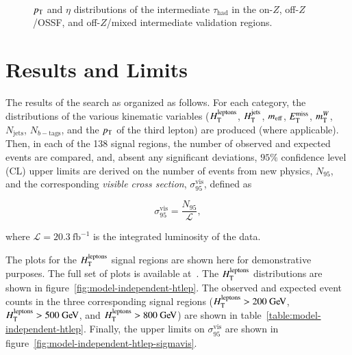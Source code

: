 \begin{figure}[tbp]
  \hfill
   \\
  \caption{$p_{\text{T}}$ and $\eta$ distributions of the intermediate $\tau_{\mathrm{had}}$ in the on-$Z$, off-$Z$/OSSF, and off-$Z$/mixed intermediate validation regions. }
  \label{fig:model-independent-VR-intermediate-tau}
\end{figure}


\section{Results and Limits}\label{sec:model-independent-results}
The results of the search as organized as follows. For each category, the distributions of the various kinematic variables ($H_{\mathrm{T}}^{\mathrm{leptons}}$, $H_{\mathrm{T}}^{\mathrm{jets}}$, $m_{\mathrm{eff}}$, $E_{\text{T}}^{\text{miss}}$, $m_{\mathrm{T}}^W$, $N_{\mathrm{jets}}$, $N_{b-\mathrm{tags}}$, and the $p_{\text{T}}$ of the third lepton) are produced (where applicable). Then, in each of the 138 signal regions, the number of observed and expected events are compared, and, absent any significant deviations, $95\%$ confidence level (CL) upper limits are derived on the number of events from new physics, $N_{95}$, and the corresponding \emph{visible cross section}, $\sigma_{95}^{\mathrm{vis}}$, defined as

\begin{equation}
	\sigma_{95}^{\mathrm{vis}} = \frac{N_{95}}{\mathcal{L}},
\end{equation}

where $\mathcal{L}=20.3~\mbox{fb}^{-1}$ is the integrated luminosity of the data.

The plots for the $H_{\mathrm{T}}^{\mathrm{leptons}}$ signal regions are shown here for demonstrative purposes. The full set of plots is available at~\cite{model-independent-webpage}. The $H_{\mathrm{T}}^{\mathrm{leptons}}$ distributions are shown in figure~\ref{fig:model-independent-htlep}. The observed and expected event counts in the three corresponding signal regions ($\htlep>200 \GeV$, $\htlep>500 \GeV$, and $\htlep>800 \GeV$) are shown in table~\ref{table:model-independent-htlep}. Finally, the upper limits on $\sigma_{95}^{\mathrm{vis}}$ are shown in figure~\ref{fig:model-independent-htlep-sigmavis}. 

